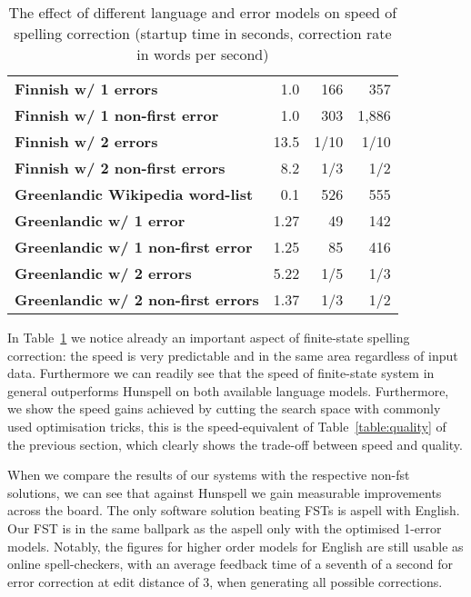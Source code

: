 \documentclass[a4paper,12pt]{article}
\begin{document}
\begin{table}
\begin{tabular}{|l|r|r|r|}
        \bf Finnish w/ 1 errors   & 1.0  & 166 & 357   \\
\bf Finnish w/ 1 non-first error  & 1.0  & 303 & 1,886  \\
        \bf Finnish w/ 2 errors   & 13.5 & 1/10 & 1/10 \\
\bf Finnish w/ 2 non-first errors & 8.2  & 1/3  & 1/2 \\
        \hline
        \bf Greenlandic Wikipedia word-list    & 0.1  & 526 & 555\\
        \hline
        \bf Greenlandic w/ 1 error    & 1.27 & 49 & 142 \\
\bf Greenlandic w/ 1 non-first error  & 1.25 & 85 & 416 \\
       \bf Greenlandic w/ 2 errors    & 5.22 & 1/5 & 1/3 \\
\bf Greenlandic w/ 2 non-first errors & 1.37 & 1/3 & 1/2 \\
        \hline
    \end{tabular}
    \caption{The effect of different language and error models on speed of
        spelling correction (startup time in seconds, correction rate in 
        words per second) \label{table:speed}}
\end{table}


In Table~\ref{table:speed} we notice already an important aspect of
finite-state spelling correction: the speed is very predictable and in the same
area regardless of input data. Furthermore we can readily see that the speed
of finite-state system in general outperforms Hunspell on both available
language models.
Furthermore, we show the speed gains achieved by cutting the
search space with commonly used optimisation tricks, this is the
speed-equivalent of Table~\ref{table:quality} of the previous section, which
clearly shows the trade-off between speed and quality.

When we compare the results of our systems with the respective non-fst
solutions, we can see that against Hunspell we gain measurable improvements
across the board. The only software solution beating FSTs is aspell with
English. Our FST is in the same
ballpark as the aspell only with the optimised 1-error models.  Notably, the
figures for higher order models for English are still usable as online
spell-checkers, with an average feedback time of a seventh of a second for
error correction at edit distance of 3, when generating all possible
corrections.
\end{document}
